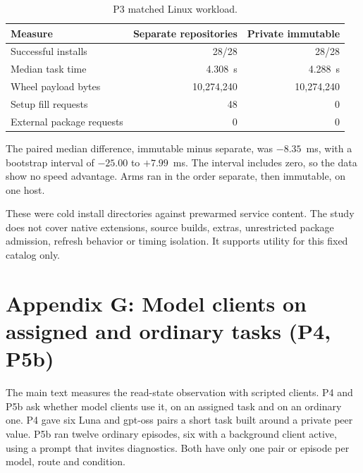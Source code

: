 {\begin{table}[!ht]\centering\small
\begin{tabular}{lrr}\toprule
Measure & Separate repositories & Private immutable \\\midrule
Successful installs & 28/28 & 28/28 \\
Median task time & 4.308~s & 4.288~s \\
Wheel payload bytes & 10,274,240 & 10,274,240 \\
Setup fill requests & 48 & 0 \\
External package requests & 0 & 0 \\\bottomrule
\end{tabular}
\caption{P3 matched Linux workload.}
\end{table}

The paired median difference, immutable minus separate, was $-8.35$~ms, with a bootstrap interval of $-25.00$ to $+7.99$~ms.
The interval includes zero, so the data show no speed advantage.
Arms ran in the order separate, then immutable, on one host.

These were cold install directories against prewarmed service content.
The study does not cover native extensions, source builds, extras, unrestricted package admission, refresh behavior or timing isolation.
It supports utility for this fixed catalog only.

\section*{Appendix G: Model clients on assigned and ordinary tasks (P4, P5b)}

The main text measures the read-state observation with scripted clients.
P4 and P5b ask whether model clients use it, on an assigned task and on an ordinary one.
P4 gave six Luna and gpt-oss pairs a short task built around a private peer value.
P5b ran twelve ordinary episodes, six with a background client active, using a prompt that invites diagnostics.
Both have only one pair or episode per model, route and condition.

}
